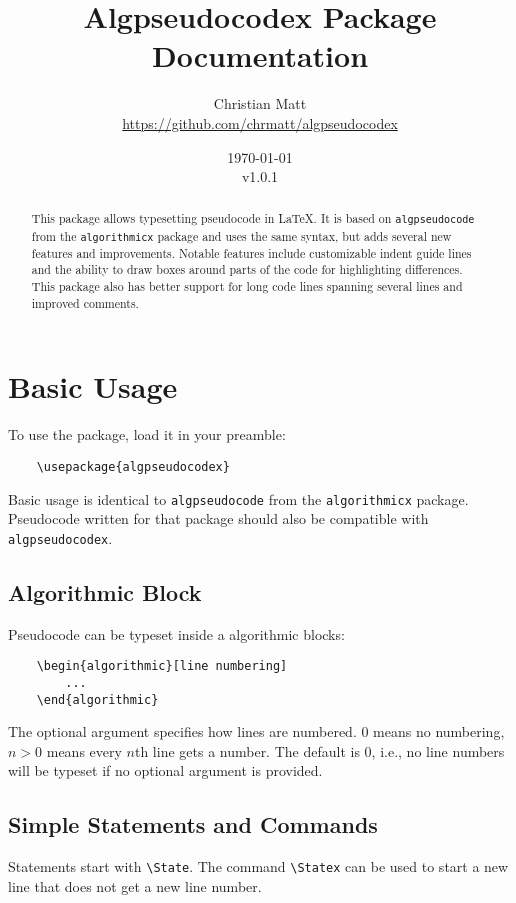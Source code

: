 \documentclass[11pt,a4paper,USenglish]{article}
\title{\bf{Algpseudocodex Package Documentation}}
\author{Christian Matt \\ \url{https://github.com/chrmatt/algpseudocodex}}
\date{\today\\v1.0.1}
\begin{document}
\maketitle

\begin{abstract}
	This package allows typesetting pseudocode in \LaTeX. It is based on \texttt{algpseudocode} from the \texttt{algorithmicx} package and uses the same syntax, but adds several new features and improvements. Notable features include customizable indent guide lines and the ability to draw boxes around parts of the code for highlighting differences. This package also has better support for long code lines spanning several lines and improved comments.
\end{abstract}

\newpage

\tableofcontents

\newpage

\section{Basic Usage}
To use the package, load it in your preamble:
\begin{verbatim}
	\usepackage{algpseudocodex}
\end{verbatim}

Basic usage is identical to \texttt{algpseudocode} from the \texttt{algorithmicx} package. Pseudocode written for that package should also be compatible with \texttt{algpseudocodex}.

\subsection{Algorithmic Block}
Pseudocode can be typeset inside a algorithmic blocks:
\begin{verbatim}
	\begin{algorithmic}[line numbering]
	    ...
	\end{algorithmic}
\end{verbatim}
The optional argument specifies how lines are numbered. $0$ means no numbering, $n > 0$ means every $n$th line gets a number. The default is $0$, i.e., no line numbers will be typeset if no optional argument is provided.

\subsection{Simple Statements and Commands}
Statements start with \verb|\State|. The command \verb|\Statex| can be used to start a new line that does not get a new line number.
\end{document}
